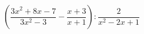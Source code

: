 \begin{ex}[type=expression]
	\begin{condition}
		\( \left( \dfrac{3x^2+8x-7}{3x^2-3}-\dfrac{x+3}{x+1} \right):\dfrac{2}{x^2-2x+1} \)
	\end{condition}
\end{ex}